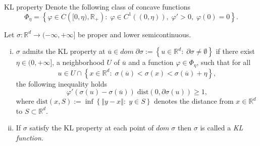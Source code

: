 \documentclass[9pt,handout]{beamer} %
\newcommand{\rr}{\mathbb{R}} %
\newcommand{\norm}[1]{\left\Vert {#1} \right\Vert} %
\newcommand{\dist}{\mathrm{dist}} %
\begin{document}
	\begin{frame}{KL property}
		Denote the following class of concave functions
\begin{equation*}
	\Phi_{\eta} = \left\lbrace \varphi \in C\left([0,\eta), \rr_+ \right)  : \; \varphi \in C^1\left((0,\eta)\right), \; \varphi'>0, \; \varphi(0)=0 \right\rbrace .
\end{equation*}

		\begin{definition}
	Let $\sigma: \rr^d \rightarrow (-\infty,+\infty]$ be proper and lower semicontinuous.
			\begin{enumerate}[(i)]
				\item $\sigma$ admits the KL property at $\overline{u} \in dom \; \partial\sigma :=  \left\lbrace u \in \rr^d : \; \partial\sigma \neq \emptyset \right\rbrace$ if there exist $\eta \in (0,+\infty]$, a neighborhood $U$ of $\overline{u}$ and a function $\varphi \in \Phi_{\eta}$, such that for all
				\begin{equation*}
					u \in U \cap \left\lbrace x \in \rr^d : \; \sigma(\overline{u}) < \sigma(x) < \sigma(\overline{u}) + \eta \right\rbrace,
				\end{equation*}
		the following inequality holds
		\begin{equation*}
			\varphi'(\sigma(u) - \sigma(\overline{u}))\;\dist(0,\partial\sigma(u)) \geq 1,
		\end{equation*}
		where $\dist(x,S) := \inf \left\lbrace \norm{y-x} : \; y \in S\right\rbrace$ denotes the distance from $x \in \rr^d$ to $S \subset \rr^d$.
		\item If $\sigma$ satisfy the KL property at each point of $dom\;\sigma$ then $\sigma$ is called a \textit{KL function}.
	\end{enumerate}
\end{definition}
	\end{frame}
\end{document}

